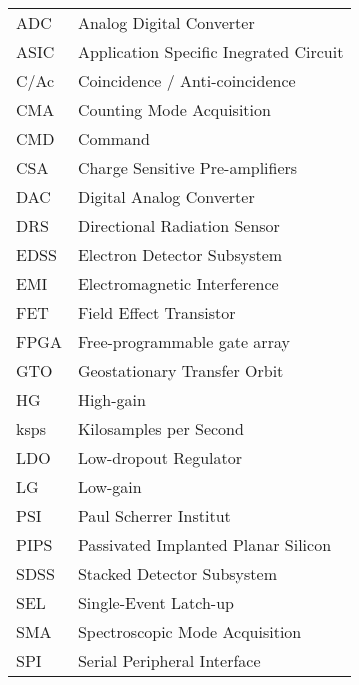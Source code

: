 \begin{center}
\begin{tabular}{p{2cm}p{8cm}}
	ADC & Analog Digital Converter \\
	ASIC & Application Specific Inegrated Circuit \\
    C/Ac & Coincidence / Anti-coincidence \\
    CMA & Counting Mode Acquisition \\
    CMD & Command					\\
	CSA & Charge Sensitive Pre-amplifiers \\
	DAC & Digital Analog Converter \\
	DRS & Directional Radiation Sensor \\
	EDSS & Electron Detector Subsystem \\
	EMI & Electromagnetic Interference \\
	FET & Field Effect Transistor \\
    FPGA & Free-programmable gate array \\
	GTO & Geostationary Transfer Orbit \\
    HG & High-gain \\
    ksps & Kilosamples per Second \\
	LDO & Low-dropout Regulator \\
    LG & Low-gain \\
	PSI & Paul Scherrer Institut \\
	PIPS & Passivated Implanted Planar Silicon \\
	SDSS & Stacked Detector Subsystem \\
	SEL & Single-Event Latch-up \\
    SMA & Spectroscopic Mode Acquisition \\
	SPI & Serial Peripheral Interface \\
\end{tabular}
\end{center}
